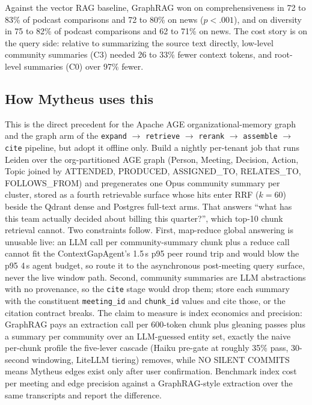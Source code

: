 Against the vector RAG baseline, GraphRAG won on comprehensiveness in 72 to 83\% of podcast comparisons and 72 to 80\% on news ($p<.001$), and on diversity in 75 to 82\% of podcast comparisons and 62 to 71\% on news. The cost story is on the query side: relative to summarizing the source text directly, low-level community summaries (C3) needed 26 to 33\% fewer context tokens, and root-level summaries (C0) over 97\% fewer.

\subsection{How Mytheus uses this}
\begin{takeaway}
This is the direct precedent for the Apache AGE organizational-memory graph and the graph arm of the \texttt{expand} $\to$ \texttt{retrieve} $\to$ \texttt{rerank} $\to$ \texttt{assemble} $\to$ \texttt{cite} pipeline, but adopt it offline only. Build a nightly per-tenant job that runs Leiden over the org-partitioned AGE graph (Person, Meeting, Decision, Action, Topic joined by ATTENDED, PRODUCED, ASSIGNED\_TO, RELATES\_TO, FOLLOWS\_FROM) and pregenerates one Opus community summary per cluster, stored as a fourth retrievable surface whose hits enter RRF ($k=60$) beside the Qdrant dense and Postgres full-text arms. That answers ``what has this team actually decided about billing this quarter?'', which top-10 chunk retrieval cannot. Two constraints follow. First, map-reduce global answering is unusable live: an LLM call per community-summary chunk plus a reduce call cannot fit the ContextGapAgent's 1.5\,s p95 peer round trip and would blow the p95 4\,s agent budget, so route it to the asynchronous post-meeting query surface, never the live window path. Second, community summaries are LLM abstractions with no provenance, so the \texttt{cite} stage would drop them; store each summary with the constituent \texttt{meeting\_id} and \texttt{chunk\_id} values and cite those, or the citation contract breaks. The claim to measure is index economics and precision: GraphRAG pays an extraction call per 600-token chunk plus gleaning passes plus a summary per community over an LLM-guessed entity set, exactly the naive per-chunk profile the five-lever cascade (Haiku pre-gate at roughly 35\% pass, 30-second windowing, LiteLLM tiering) removes, while NO SILENT COMMITS means Mytheus edges exist only after user confirmation. Benchmark index cost per meeting and edge precision against a GraphRAG-style extraction over the same transcripts and report the difference.
\end{takeaway}

